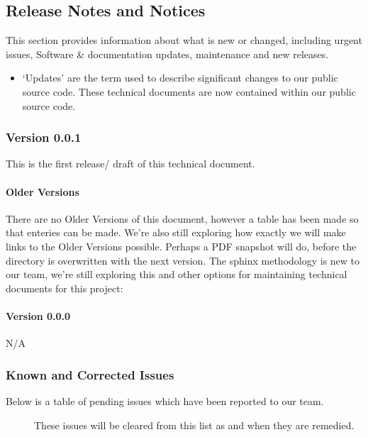\documentclass[letterpaper,10pt,english]{sphinxmanual}
\begin{document}
\subsection{Release Notes and Notices}
\label{\detokenize{releasenotes:release-notes-and-notices}}\label{\detokenize{releasenotes::doc}}
This section provides information about what is new or changed, including urgent issues, Software \& documentation updates, maintenance and new releases.
\begin{itemize}
\item {} 
‘Updates’ are the term used to describe significant changes to our public source code. These technical documents are now contained within our public source code.

\end{itemize}


\subsubsection{Version 0.0.1}
\label{\detokenize{releasenotes:version-0-0-1}}
This is the first release/ draft of this technical document.


\paragraph{Older Versions}
\label{\detokenize{releasenotes:older-versions}}
There are no Older Versions of this document, however a table has been made so that enteries can be made. We’re also still exploring how exactly we will make links to the Older Versions possible. Perhaps a PDF snapshot will do, before the directory is overwritten with the next version. The sphinx methodology is new to our team, we’re still exploring this and other options for maintaining technical documents for this project:


\paragraph{Version 0.0.0}
\label{\detokenize{releasenotes:version-0-0-0}}
N/A


\subsubsection{Known and Corrected Issues}
\label{\detokenize{releasenotes:known-and-corrected-issues}}\begin{description}
\item[{Below is a table of pending issues which have been reported to our team.}] \leavevmode
These issues will be cleared from this list as and when they are remedied.

\end{description}
\end{document}
